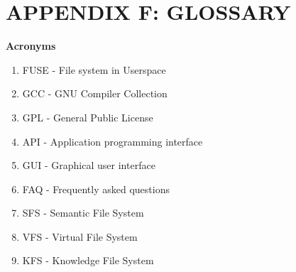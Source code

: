 \chapter*{APPENDIX F: GLOSSARY}

\noindent \textbf{Acronyms} 
\begin{enumerate}
\item FUSE - File system in Userspace
\item GCC  - GNU Compiler Collection
\item GPL  - General Public License
\item API  - Application programming interface
\item GUI  - Graphical user interface
\item FAQ  - Frequently asked questions 
\item SFS  - Semantic File System
\item VFS  - Virtual File System
\item KFS  - Knowledge File System
\\
\end{enumerate}


